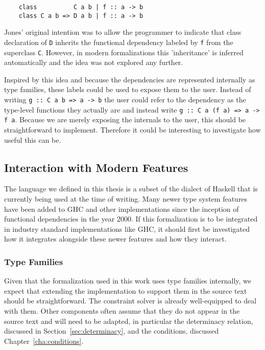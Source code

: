 \begin{verbatim}
    class          C a b | f :: a -> b
    class C a b => D a b | f :: a -> b
\end{verbatim}

Jones' original intention was to allow the programmer to indicate that class
declaration of \texttt{D} inherits the functional dependency labeled by
\texttt{f} from the superclass \texttt{C}. However, in modern formalizations
this 'inheritance' is inferred automatically and the idea was not explored any
further.

Inspired by this idea and because the dependencies are represented internally as
type families, these labels could be used to expose them to the user. Instead of
writing \texttt{g :: C a b => a -> b} the user could refer to the dependency as
the type-level functions they actually are and instead write \texttt{g :: C a (f
a) => a -> f a}. Because we are merely exposing the internals to the user, this
should be straightforward to implement. Therefore it could be interesting to
investigate how useful this can be.

\subsection{Interaction with Modern Features}

The language we defined in this thesis is a subset of the dialect of Haskell
that is currently being used at the time of writing. Many newer type system
features have been added to GHC and other implementations since the inception of
functional dependencies in the year 2000. If this formalization is to be
integrated in industry standard implementations like GHC, it should first be
investigated how it integrates alongside these newer features and how they
interact.

\subsubsection{Type Families}

Given that the formalization used in this work uses type families internally, we
expect that extending the implementation to support them in the source text
should be straightforward. The constraint solver is already well-equipped to
deal with them. Other components often assume that they do not appear
in the source text and will need to be adapted, in particular the determinacy
relation, discussed in Section~\ref{sec:determinacy}, and the conditions,
discussed Chapter~\ref{cha:conditions}.

